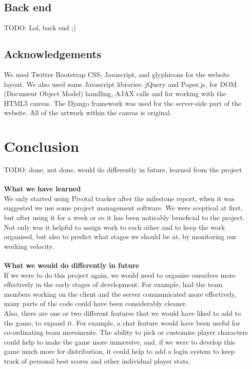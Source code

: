 \documentclass{article}
\begin{document}
\subsection{Back end}
TODO: Lol, back end ;)

\subsection{Acknowledgements}
We used Twitter Bootstrap CSS, Javascript, and glyphicons for the website layout. We also used some Javascript libraries: jQuery and Paper.js, for DOM (Document Object Model) handling, AJAX calls and for working with the HTML5 canvas. The Django framework was used for the server-side part of the website. All of the artwork within the canvas is original.

\section{Conclusion}
TODO: done, not done, would do differently in future, learned from the project \\ \\
\textbf{What we have learned} \\
We only started using Pivotal tracker after the milestone report, when it was suggested we use some project management software. We were sceptical at first, but after using it for a week or so it has been noticably beneficial to the project. Not only was it helpful to assign work to each other and to keep the work organised, but also to predict what stages we should be at, by monitoring our working velocity. \\ \\
\textbf{What we would do differently in future} \\
If we were to do this project again, we would need to organise ourselves more effectively in the early stages of development. For example, had the team members working on the client and the server communicated more effectively, many parts of the code could have been considerably cleaner. \\
Also, there are one or two different features that we would have liked to add to the game, to expand it. For example, a chat feature would have been useful for co-ordinating team movements. The ability to pick or customise player characters could help to make the game more immersive, and, if we were to develop this game much more for distribution, it could help to add a login system to keep track of personal best scores and other individual player stats.
\end{document}
